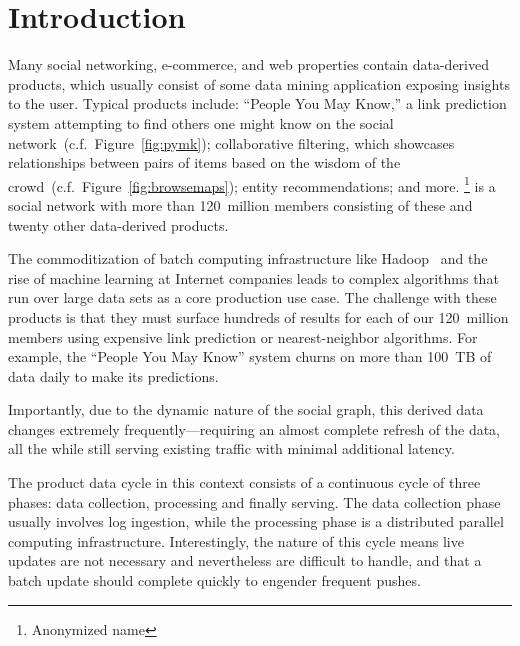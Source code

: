 \section{Introduction}
\label{sec:introduction}

Many social networking, e-commerce, and web properties contain
data-derived products, which usually consist of some data mining
application exposing insights to the user. Typical products include:
``People You May Know,'' a link prediction system attempting to find
others one might know on the social
network~(c.f.~Figure~\ref{fig:pymk}); collaborative filtering, which
showcases relationships between pairs of items based on the wisdom of
the crowd~(c.f.~Figure~\ref{fig:browsemaps}); entity
recommendations; and more. \linkedin\footnote{Anonymized name} is a
social network with more than 120~million members consisting of
these and twenty other data-derived products. 

The commoditization of batch computing infrastructure like Hadoop~\cite{hadoop}
 and the rise of machine learning at Internet companies leads to complex
algorithms that run over large data sets as a core production use
case. The challenge with these products is that they must surface
hundreds of results for each of our 120~million members using
expensive link prediction or nearest-neighbor algorithms. For example,
the ``People You May Know'' system churns on more than 100~TB of data
daily to make its predictions.

Importantly, due to the dynamic nature of the social graph, this
derived data changes extremely frequently---requiring an almost
complete refresh of the data, all the while still serving existing
traffic with minimal additional latency. 

The product data cycle in this context consists of a continuous cycle
of three phases: data collection, processing and finally serving. The
data collection phase usually involves log ingestion, while the
processing phase is a distributed parallel computing infrastructure.
Interestingly, the nature of this cycle means live updates are not
necessary and nevertheless are difficult to handle, and that a batch
update should complete quickly to engender frequent pushes.
 
